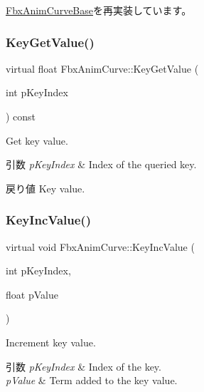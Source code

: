 \hyperlink{class_fbx_anim_curve_base_a9db34dd56ce9822d0d6723ce7d50c4a3}{Fbx\+Anim\+Curve\+Base}を再実装しています。

\mbox{\label{class_fbx_anim_curve_a1d0a4728a6c8c1c0260fd368ba64ccb6}} 
\subsubsection{\texorpdfstring{Key\+Get\+Value()}{KeyGetValue()}}
{\footnotesize\ttfamily virtual float Fbx\+Anim\+Curve\+::\+Key\+Get\+Value (\begin{DoxyParamCaption}\item[{int}]{p\+Key\+Index }\end{DoxyParamCaption}) const\hspace{0.3cm}{\ttfamily [pure virtual]}}

Get key value. 
\begin{DoxyParams}{引数}
{\em p\+Key\+Index} & Index of the queried key. \\
\hline
\end{DoxyParams}
\begin{DoxyReturn}{戻り値}
Key value. 
\end{DoxyReturn}
\mbox{\label{class_fbx_anim_curve_a38cdb5a33a9d7195f9e74b0fb4aa3261}} 
\subsubsection{\texorpdfstring{Key\+Inc\+Value()}{KeyIncValue()}}
{\footnotesize\ttfamily virtual void Fbx\+Anim\+Curve\+::\+Key\+Inc\+Value (\begin{DoxyParamCaption}\item[{int}]{p\+Key\+Index,  }\item[{float}]{p\+Value }\end{DoxyParamCaption})\hspace{0.3cm}{\ttfamily [pure virtual]}}

Increment key value. 
\begin{DoxyParams}{引数}
{\em p\+Key\+Index} & Index of the key. \\
\hline
{\em p\+Value} & Term added to the key value. \\
\hline
\end{DoxyParams}
\mbox{\label{class_fbx_anim_curve_aaad0086794bde7063d868956c6fc6b3f}} 
